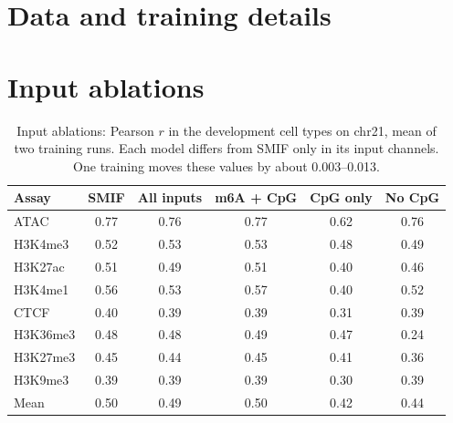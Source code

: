 \documentclass[acmtog,nonacm]{acmart}   %
\begin{document}
\section{Data and training details}
\label{app:data}

\section{Input ablations}
\label{app:ablations}

\begin{table}[t]
\caption{Input ablations: Pearson $r$ in the development cell types on chr21, mean of two training runs. Each model
differs from SMIF only in its input channels. One training moves these values by about 0.003--0.013.}
\label{tab:ablations}
\small
\begin{tabular}{@{}lccccc@{}}
\toprule
Assay & SMIF & All inputs & m6A + CpG & CpG only & No CpG \\
\midrule
ATAC & 0.77 & 0.76 & 0.77 & 0.62 & 0.76 \\
H3K4me3 & 0.52 & 0.53 & 0.53 & 0.48 & 0.49 \\
H3K27ac & 0.51 & 0.49 & 0.51 & 0.40 & 0.46 \\
H3K4me1 & 0.56 & 0.53 & 0.57 & 0.40 & 0.52 \\
CTCF & 0.40 & 0.39 & 0.39 & 0.31 & 0.39 \\
H3K36me3 & 0.48 & 0.48 & 0.49 & 0.47 & 0.24 \\
H3K27me3 & 0.45 & 0.44 & 0.45 & 0.41 & 0.36 \\
H3K9me3 & 0.39 & 0.39 & 0.39 & 0.30 & 0.39 \\
\midrule
Mean & 0.50 & 0.49 & 0.50 & 0.42 & 0.44 \\
\bottomrule
\end{tabular}
\end{table}
\end{document}
